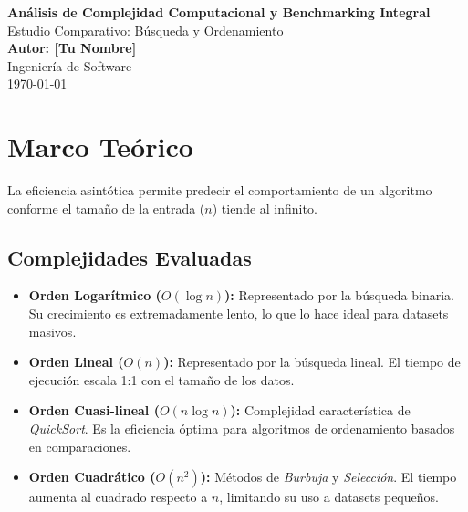 \documentclass[12pt,a4paper]{article}
\begin{document}
\begin{titlepage}
    \centering
    \vspace*{1cm}
    \Huge
    \textbf{Análisis de Complejidad Computacional y Benchmarking Integral} \\
    \vspace{0.5cm}
    \LARGE
    Estudio Comparativo: Búsqueda y Ordenamiento \\
    \vspace{1.5cm}
    \textbf{Autor: [Tu Nombre]} \\
    \vfill
    \Large
    Ingeniería de Software \\
    \today
\end{titlepage}

\tableofcontents
\newpage

\begin{abstract}
Este informe documenta la evaluación empírica de algoritmos fundamentales de búsqueda y ordenamiento. El estudio abarca desde métodos de fuerza bruta ($O(n^2)$) hasta algoritmos de tipo "Divide y Vencerás" ($O(n \log n)$). A través de un análisis de regresión sobre tiempos de ejecución reales, se valida la jerarquía de eficiencia de la Notación Big O, demostrando por qué la elección algorítmica es crítica en el manejo de grandes volúmenes de datos.
\end{abstract}

\section{Marco Teórico}
La eficiencia asintótica permite predecir el comportamiento de un algoritmo conforme el tamaño de la entrada ($n$) tiende al infinito.

\subsection{Complejidades Evaluadas}
\begin{itemize}
    \item \textbf{Orden Logarítmico ($O(\log n)$):} Representado por la búsqueda binaria. Su crecimiento es extremadamente lento, lo que lo hace ideal para datasets masivos.
    \item \textbf{Orden Lineal ($O(n)$):} Representado por la búsqueda lineal. El tiempo de ejecución escala 1:1 con el tamaño de los datos.
    \item \textbf{Orden Cuasi-lineal ($O(n \log n)$):} Complejidad característica de \textit{QuickSort}. Es la eficiencia óptima para algoritmos de ordenamiento basados en comparaciones.
    \item \textbf{Orden Cuadrático ($O(n^2)$):} Métodos de \textit{Burbuja} y \textit{Selección}. El tiempo aumenta al cuadrado respecto a $n$, limitando su uso a datasets pequeños.
\end{itemize}
\end{document}
